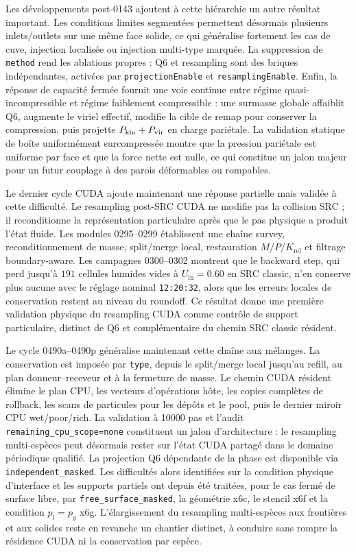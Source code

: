 \documentclass[11pt,a4paper]{article}
\begin{document}
Les développements post-0143 ajoutent à cette hiérarchie un autre résultat important. Les conditions limites segmentées permettent désormais plusieurs inlets/outlets sur une même face solide, ce qui généralise fortement les cas de cuve, injection localisée ou injection multi-type marquée. La suppression de \texttt{method} rend les ablations propres : Q6 et resampling sont des briques indépendantes, activées par \texttt{projectionEnable} et \texttt{resamplingEnable}. Enfin, la réponse de capacité fermée fournit une voie continue entre régime quasi-incompressible et régime faiblement compressible : une surmasse globale affaiblit Q6, augmente le viriel effectif, modifie la cible de remap pour conserver la compression, puis projette \(P_{\rm kin}+P_{\rm vir}\) en charge pariétale. La validation statique de boîte uniformément surcompressée montre que la pression pariétale est uniforme par face et que la force nette est nulle, ce qui constitue un jalon majeur pour un futur couplage à des parois déformables ou rompables.



Le dernier cycle CUDA ajoute maintenant une réponse partielle mais validée à cette difficulté. Le resampling post-SRC CUDA ne modifie pas la collision SRC ; il reconditionne la représentation particulaire après que le pas physique a produit l'état fluide. Les modules 0295--0299 établissent une chaîne survey, reconditionnement de masse, split/merge local, restauration $M/P/K_{\mathrm{rel}}$ et filtrage boundary-aware. Les campagnes 0300--0302 montrent que le backward step, qui perd jusqu'à $191$ cellules humides vides à $U_{\mathrm{in}}=0.60$ en SRC classic, n'en conserve plus aucune avec le réglage nominal \texttt{12:20:32}, alors que les erreurs locales de conservation restent au niveau du roundoff. Ce résultat donne une première validation physique du resampling CUDA comme contrôle de support particulaire, distinct de Q6 et complémentaire du chemin SRC classic résident.


Le cycle 0490a--0490p généralise maintenant cette chaîne aux mélanges. La conservation est imposée par \texttt{type}, depuis le split/merge local jusqu'au refill, au plan donneur--receveur et à la fermeture de masse. Le chemin CUDA résident élimine le plan CPU, les vecteurs d'opérations hôte, les copies complètes de rollback, les scans de particules pour les dépôts et le pool, puis le dernier miroir CPU wet/poor/rich. La validation à 10000 pas et l'audit \texttt{remaining\_cpu\_scope=none} constituent un jalon d'architecture : le resampling multi-espèces peut désormais rester sur l'état CUDA partagé dans le domaine périodique qualifié. La projection Q6 dépendante de la phase est disponible via \texttt{independent\_masked}. Les difficultés alors identifiées sur la condition physique d'interface et les supports partiels ont depuis été traitées, pour le cas fermé de surface libre, par \texttt{free\_surface\_masked}, la géométrie x6c, le stencil x6f et la condition $p_l=p_g$ x6g. L'élargissement du resampling multi-espèces aux frontières et aux solides reste en revanche un chantier distinct, à conduire sans rompre la résidence CUDA ni la conservation par espèce.
\end{document}
